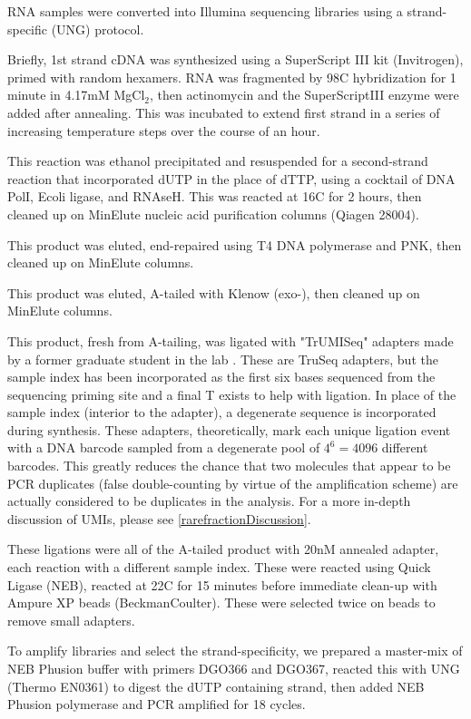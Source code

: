 {RNA samples were converted into Illumina sequencing libraries using a
strand-specific (UNG) protocol.

Briefly, 1st strand cDNA was synthesized using a SuperScript III kit
(Invitrogen), primed with random hexamers. RNA was fragmented by
98C hybridization for 1 minute in 4.17mM MgCl$_2$, then actinomycin
and the SuperScriptIII enzyme were added after annealing.  
This was incubated to extend first strand in a series of increasing
temperature steps over the course of an hour.

This reaction was ethanol precipitated
and resuspended for a second-strand reaction that incorporated dUTP
in the place of dTTP, using a cocktail of DNA PolI, Ecoli ligase, and
RNAseH. This was reacted at 16C for 2 hours, then cleaned up on
MinElute nucleic acid purification columns (Qiagen 28004).

This product was eluted, end-repaired using T4 DNA polymerase and PNK,
then cleaned up on MinElute columns.

This product was eluted, A-tailed with Klenow (exo-), 
then cleaned up on MinElute columns.

This product, fresh from A-tailing, was ligated with "TrUMISeq"
adapters made by a former graduate student in the lab
\parencite{hong2017method}. These are TruSeq adapters, but the
sample index has been incorporated as the first six bases sequenced
from the sequencing priming site and a final T exists to help with
ligation. In place of the sample index (interior to the adapter),
a degenerate sequence is incorporated during synthesis.
These adapters, theoretically, mark each unique ligation event
with a DNA barcode sampled from a degenerate pool of $4^6 = 4096$
different barcodes. This greatly reduces the chance that two
molecules that appear to be PCR duplicates (false double-counting
by virtue of the amplification scheme) are actually considered
to be duplicates in the analysis. For a more in-depth discussion of
UMIs, please see
\autoref{rarefractionDiscussion}.

These ligations were all of the A-tailed product with 20nM annealed
adapter, each reaction with a different sample index. These were
reacted using Quick Ligase (NEB), reacted at 22C for 15 minutes
before immediate clean-up with Ampure XP beads (BeckmanCoulter).
These were selected twice on beads to remove small adapters.

To amplify libraries and select the strand-specificity, we prepared a
master-mix of NEB Phusion buffer with primers DGO366 and DGO367,
reacted this with UNG (Thermo EN0361) to digest the dUTP containing
strand, then added NEB Phusion polymerase and PCR amplified for
18 cycles.

}
